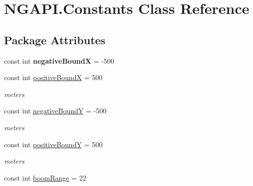 \hypertarget{class_n_g_a_p_i_1_1_constants}{}\section{N\+G\+A\+P\+I.\+Constants Class Reference}
\label{class_n_g_a_p_i_1_1_constants}
\subsection*{Package Attributes}
\begin{DoxyCompactItemize}
\item 
\mbox{\label{class_n_g_a_p_i_1_1_constants_ae472807fb63b4e373ceaf47d106fe683}} 
const int {\bfseries negative\+BoundX} = -\/500
\item 
\mbox{\label{class_n_g_a_p_i_1_1_constants_a83c25fcd2c4c7ae066ef3cfcf3911a35}} 
const int \hyperlink{class_n_g_a_p_i_1_1_constants_a83c25fcd2c4c7ae066ef3cfcf3911a35}{positive\+BoundX} = 500
\begin{DoxyCompactList}\small\item\em meters \end{DoxyCompactList}\item 
\mbox{\label{class_n_g_a_p_i_1_1_constants_a4707fd864a5c56e69ca8e883b0349b25}} 
const int \hyperlink{class_n_g_a_p_i_1_1_constants_a4707fd864a5c56e69ca8e883b0349b25}{negative\+BoundY} = -\/500
\begin{DoxyCompactList}\small\item\em meters \end{DoxyCompactList}\item 
\mbox{\label{class_n_g_a_p_i_1_1_constants_abea9591d5d6b6d034b54b17811f50fc9}} 
const int \hyperlink{class_n_g_a_p_i_1_1_constants_abea9591d5d6b6d034b54b17811f50fc9}{positive\+BoundY} = 500
\begin{DoxyCompactList}\small\item\em meters \end{DoxyCompactList}\item 
\mbox{\label{class_n_g_a_p_i_1_1_constants_a4a79f826c1b43e40b8ea3838d9871a34}} 
const int \hyperlink{class_n_g_a_p_i_1_1_constants_a4a79f826c1b43e40b8ea3838d9871a34}{boom\+Range} = 22

\end{DoxyCompactItemize}
